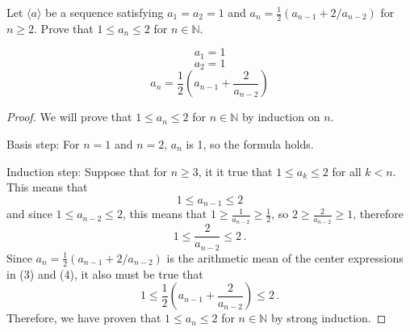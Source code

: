 \documentclass[10pt,letterpaper]{article}
\newcommand{\N}{\mathbb{N}}
\newenvironment{problem}[2][Problem]{\begin{trivlist}
\item[\hskip \labelsep {\bfseries #1}\hskip \labelsep {\bfseries #2.}]}{\end{trivlist}}
\begin{document}
\begin{problem}{3.57}
Let $\langle a \rangle$ be a sequence satisfying $a_1 = a_2 = 1$ and $a_n=\frac{1}{2}(a_{n-1}+2/a_{n-2})$ for $n \geq 2$. Prove that $1 \leq a_n \leq 2$ for $n \in \N$. 

$$a_1=1$$
$$a_2=1$$
$$a_n= \frac{1}{2} \left( a_{n-1}+ \frac{2}{a_{n-2}} \right) $$
\end{problem}

\begin{proof}
We will prove that $1 \leq a_n \leq 2$ for $n \in \N$ by induction on $n$. 

Basis step: For $n=1$ and $n=2$, $a_n$ is 1, so the formula holds. %

Induction step: Suppose that for $n \geq 3$, it it true that $1 \leq a_k \leq 2$ for all $k<n$. This means that 
\begin{equation}
1 \leq a_{n-1} \leq 2
\end{equation}
and since $1 \leq a_{n-2} \leq 2$, this means that $1 \geq \frac{1}{a_{n-2}} \geq \frac{1}{2}$, so $2 \geq \frac{2}{a_{n-2}} \geq 1$, therefore 
\begin{equation}
1 \leq \frac{2}{a_{n-2}} \leq 2 \, .
\end{equation}
Since $a_n=\frac{1}{2}(a_{n-1}+2/a_{n-2})$ is the arithmetic mean of the center expressions in (3) and (4), it also must be true that 
$$1 \leq \frac{1}{2} \left( a_{n-1}+ \frac{2}{a_{n-2}} \right) \leq 2\, .$$
Therefore, we have proven that $1 \leq a_n \leq 2$ for $n \in \N$ by strong induction.


\end{proof}
\end{document}
